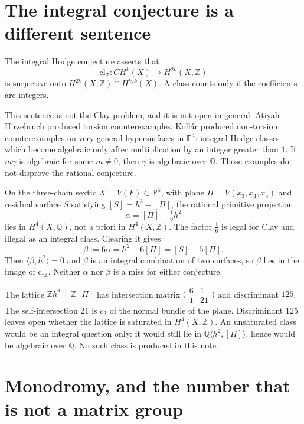 \documentclass[11pt,a4paper]{article}
\newcommand{\Q}{\mathbb{Q}}
\newcommand{\Z}{\mathbb{Z}}
\begin{document}
\section*{The integral conjecture is a different sentence}

The integral Hodge conjecture asserts that
\[
\mathrm{cl}_{\Z}\colon CH^k(X)\longrightarrow H^{2k}(X,\Z)
\]
is surjective onto \(H^{2k}(X,\Z)\cap H^{k,k}(X)\). A class counts only if the coefficients are integers.

This sentence is not the Clay problem, and it is not open in general. Atiyah--Hirzebruch produced torsion counterexamples. Koll\'ar produced non-torsion counterexamples on very general hypersurfaces in \(\mathbb{P}^4\): integral Hodge classes which become algebraic only after multiplication by an integer greater than \(1\). If \(m\gamma\) is algebraic for some \(m\neq 0\), then \(\gamma\) is algebraic over \(\Q\). Those examples do not disprove the rational conjecture.

On the three-chain sextic \(X=V(F)\subset\mathbb{P}^5\), with plane \(\Pi=V(x_3,x_4,x_5)\) and residual surface \(S\) satisfying \([S]=h^2-[\Pi]\), the rational primitive projection
\[
\alpha=[\Pi]-\tfrac16 h^2
\]
lies in \(H^4(X,\Q)\), not a priori in \(H^4(X,\Z)\). The factor \(\tfrac16\) is legal for Clay and illegal as an integral class. Clearing it gives
\[
\beta:=6\alpha=h^2-6[\Pi]=[S]-5[\Pi].
\]
Then \(\langle\beta,h^2\rangle=0\) and \(\beta\) is an integral combination of two surfaces, so \(\beta\) lies in the image of \(\mathrm{cl}_{\Z}\). Neither \(\alpha\) nor \(\beta\) is a miss for either conjecture.

The lattice \(\Z h^2+\Z[\Pi]\) has intersection matrix \(\bigl(\begin{smallmatrix}6&1\\1&21\end{smallmatrix}\bigr)\) and discriminant \(125\). The self-intersection \(21\) is \(c_2\) of the normal bundle of the plane. Discriminant \(125\) leaves open whether the lattice is saturated in \(H^4(X,\Z)\). An unsaturated class would be an integral question only: it would still lie in \(\Q\langle h^2,[\Pi]\rangle\), hence would be algebraic over \(\Q\). No such class is produced in this note.

\section*{Monodromy, and the number that is not a matrix group}
\end{document}
